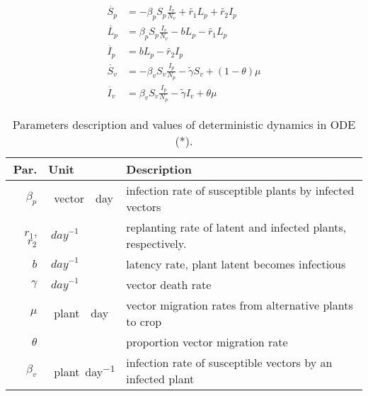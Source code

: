 \begin{equation} 
	\label{system_1} 
	\begin{aligned} 
		\dot{S_p} &= 
			-\beta_p S_p
			\frac{I_v}{N_v} + \tilde{r_1} L_p + \tilde{r_2} I_p  
		\\ 
		\dot{L_p} &= 
			\beta_p S_p
			\frac{I_v}{N_v} - b L_p - \tilde{r_1} L_p  
		\\ 
		\dot{I_p} &= 
			b L_p - \tilde{r_2} I_p  \\ 
		\dot{S_v} &= 
			-\beta_v S_v 
			\frac{I_p}{N_p} - \tilde{\gamma} S_v
			+(1-\theta) \mu  
		\\ 
		\dot{I_v} &= 
			\beta_v S_v \frac{I_p}{N_p} 
			- \tilde{\gamma} I_v
			+ \theta \mu 
	\end{aligned} 
\end{equation} 
\begin{table}
	\begin{center}
		\begin{tabular}{rll} 
			\toprule
			Par. & Unit & Description 
			\\ 
			\midrule
				$\beta_p$ 
				& 
					\SI{}{vector \per day}
				& 
					infection rate of susceptible 
					plants by infected vectors 
			\\ 
				$r_1$, $r_2$ 
				& 
					$\SI{}{day}^{-1}$ 
				& 
					replanting rate of latent and 
					infected plants, respectively. 
			\\
				$b$ 
				& 
					$\SI{}{day}^{-1}$ 
				& 
					latency rate, plant latent 
					becomes infectious 
			\\
				$\gamma$ 
				& 
					$\SI{}{day}^{-1}$ 
				&  vector death rate 
			\\
				$\mu$ 
				& \SI{}{plant \per day}
				& vector migration rates from alternative plants to crop
			\\
				$\theta$ 
				& 
				& proportion vector migration rate
			\\
				$\beta_v$ 
				& \SI{}{plant\per day}
				& infection rate of susceptible vectors by an infected plant
			\\
			\bottomrule
		\end{tabular}
	\end{center}
	\caption{
		Parameters description and values of
		deterministic dynamics in ODE (*).
	}
	\label{tbl:deterministic_tbl}
\end{table}


